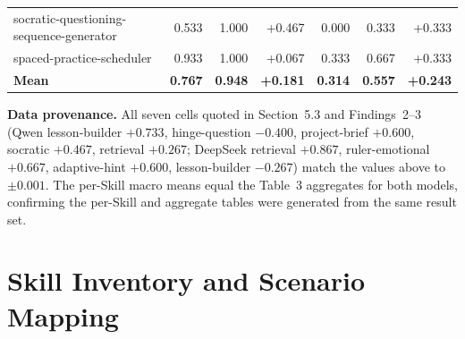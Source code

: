 \documentclass[10pt]{article}
\begin{document}
\begin{table}[H]
\begin{tabularx}{0.99\textwidth}{>{\ttfamily\raggedright\arraybackslash}Xrrrrrr}
socratic-questioning-sequence-generator & 0.533 & 1.000 & +0.467 & 0.000 & 0.333 & +0.333 \\
spaced-practice-scheduler & 0.933 & 1.000 & +0.067 & 0.333 & 0.667 & +0.333 \\
\midrule
\textbf{Mean} & \textbf{0.767} & \textbf{0.948} & \textbf{+0.181} & \textbf{0.314} & \textbf{0.557} & \textbf{+0.243} \\
\bottomrule
\end{tabularx}
\par\vspace{4pt}
{\footnotesize\textbf{Data provenance.} All seven cells quoted in Section~5.3 and Findings~2--3 (Qwen lesson-builder $+0.733$, hinge-question $-0.400$, project-brief $+0.600$, socratic $+0.467$, retrieval $+0.267$; DeepSeek retrieval $+0.867$, ruler-emotional $+0.667$, adaptive-hint $+0.600$, lesson-builder $-0.267$) match the values above to $\pm 0.001$. The per-Skill macro means equal the Table~3 aggregates for both models, confirming the per-Skill and aggregate tables were generated from the same result set.}
\end{table}

\section{Skill Inventory and Scenario Mapping}
\end{document}
